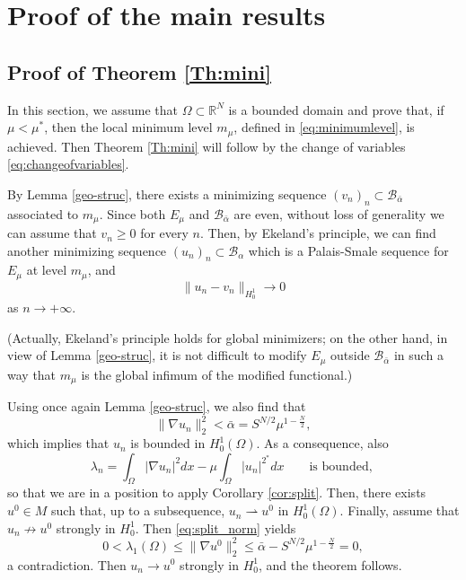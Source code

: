 \documentclass[10pt]{article}
\newcommand{\R}{\mathbb{R}}
\newcommand{\Bcal}{{\mathcal{B}}}
\theoremstyle{definition}
\numberwithin{equation}{section}
\begin{document}
\section{Proof of the main results}\label{sec:proof_main_res}
\subsection{Proof of Theorem \ref{Th:mini}}
In this section, we assume that $\Omega\subset\R^N$ is a bounded domain and prove that, if $\mu <\mu^*$,
then the local minimum level $m_{\mu}$, defined in \eqref{eq:minimumlevel}, is achieved. Then Theorem \ref{Th:mini} will follow by
the change of variables \eqref{eq:changeofvariables}.


By Lemma \ref{geo-struc}, there exists a
minimizing sequence
$(v_{n})_{n}\subset \Bcal_{\bar\alpha}$ associated to $m_{\mu}$. Since both $E_\mu$ and
$\Bcal_{\bar\alpha}$ are even, without loss of generality we can assume that $v_n\ge 0$ for
every $n$. Then, by Ekeland's principle, we can find another minimizing
sequence $(u_{n})_{n}\subset\Bcal_\alpha$ which is a Palais-Smale sequence for $E_\mu$ at level
$m_\mu$, and
\begin{equation}\label{eq:posmin}
\|u_n - v_n\|_{H^1_0}\to 0
\end{equation}
as $n\to+\infty$.


(Actually, Ekeland's principle holds for global minimizers; on the other hand, in view of Lemma
\ref{geo-struc}, it is not difficult to modify $E_\mu$ outside $\Bcal_{\bar\alpha}$ in such a way
that $m_\mu$ is the global infimum of the modified functional.)

Using once again Lemma \ref{geo-struc}, we also find that
\begin{equation}\label{bound:u:min}
\|\nabla u_{n}\|_{2}^{2}<\bar{\alpha}=S^{N/2}\mu^{1-\frac{N}{2}},
\end{equation}
which implies that $u_{n}$ is bounded in $H^{1}_{0}(\Omega)$. As a consequence,
also
\[
\lambda_n = \int_{\Omega}|\nabla u_n|^{2}dx-\mu\int_{\Omega}|u_n|^{2^{*}}dx
\qquad\text{is bounded, }
\]
so that we are in a position to apply Corollary \ref{cor:split}. Then, there exists
$u^{0}\in M$ such that, up to a subsequence, $u_{n}\rightharpoonup u^{0}$ in
$H^{1}_{0}(\Omega)$. Finally, assume that $u_n \not \to u^0$ strongly in $H^1_0$. Then
\eqref{eq:split_norm} yields
\[
0<\lambda_1(\Omega)\le\|\nabla u^0\|_2^2 \le \bar \alpha - S^{N/2}\mu^{1-\frac{N}{2}} =0,
\]
a contradiction. Then $u_n  \to u^0$ strongly in $H^1_0$, and the theorem follows.
\end{document}
